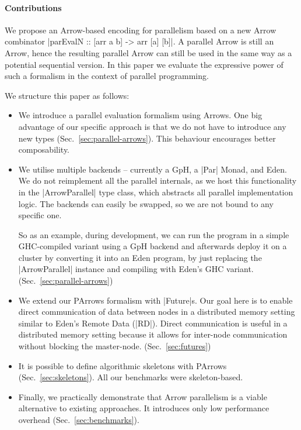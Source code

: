 \paragraph{Contributions}
%
%
We propose an Arrow-based encoding for parallelism based on a new Arrow combinator |parEvalN :: [arr a b] -> arr [a] [b]|. A parallel Arrow is still an Arrow, hence the resulting parallel Arrow can still be used in the same way as a potential sequential version. In this paper we evaluate the expressive power of such a formalism in the context of parallel programming.

We structure this paper as follows:
\begin{itemize}
\item We introduce a parallel evaluation formalism using Arrows. One big advantage of our specific approach is that we do not have to introduce any new types (Sec.~\ref{sec:parallel-arrows}). This behaviour encourages better composability.
\item We utilise multiple backends -- currently a GpH, a |Par| Monad, and Eden. We do not reimplement all the parallel internals, as we host this functionality in the |ArrowParallel| type class, which abstracts all parallel implementation logic. The backends can easily be swapped, so we are not bound to any specific one.

So as an example, during development, we can run the program in a simple GHC-compiled variant using a GpH backend and afterwards deploy it on a cluster by converting it into an Eden program, by just replacing the |ArrowParallel| instance and compiling with Eden's GHC variant. (Sec.~\ref{sec:parallel-arrows})
\item We extend our PArrows formalism with |Future|s. Our goal here is to enable direct communication of data between nodes in a distributed memory setting similar to Eden's Remote Data (|RD|). Direct communication is useful in a distributed memory setting because it allows for inter-node communication without blocking the master-node. (Sec.~\ref{sec:futures})
\item It is possible to define algorithmic skeletons with PArrows (Sec.~\ref{sec:skeletons}). All our benchmarks were skeleton-based.
\item Finally, we practically demonstrate that Arrow parallelism is a viable alternative to existing approaches. It introduces only low performance overhead (Sec.~\ref{sec:benchmarks}).
\end{itemize}

